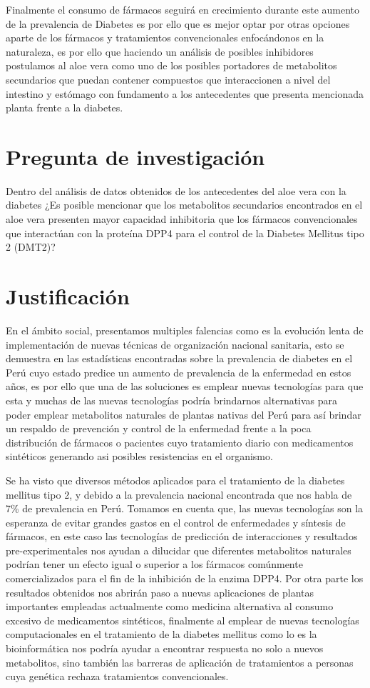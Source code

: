 Finalmente el consumo de fármacos seguirá en crecimiento durante este aumento de la prevalencia de Diabetes es por ello que es mejor optar por otras opciones aparte de los fármacos y tratamientos convencionales enfocándonos en la naturaleza, es por ello que haciendo un análisis de posibles inhibidores postulamos al aloe vera como uno de los posibles portadores de metabolitos secundarios que puedan contener compuestos que interaccionen a nivel del intestino y estómago con fundamento a los antecedentes que presenta mencionada planta frente a la diabetes.

\section{Pregunta de investigación}
Dentro del análisis de datos obtenidos de los antecedentes del aloe vera con la diabetes ¿Es posible mencionar que los metabolitos secundarios encontrados en el aloe vera presenten mayor capacidad inhibitoria que los  fármacos convencionales que interactúan con la proteína DPP4 para el control de la Diabetes Mellitus tipo 2 (DMT2)?

\section{Justificación}
En el ámbito social, presentamos multiples falencias como es la evolución lenta de implementación de nuevas técnicas de organización nacional sanitaria, esto se demuestra en las estadísticas encontradas sobre la prevalencia de diabetes en el Perú cuyo estado predice un aumento de prevalencia de la enfermedad en estos años, es por ello que una de las soluciones es emplear nuevas tecnologías para que esta y muchas de las nuevas tecnologías podría brindarnos alternativas para poder emplear metabolitos naturales de plantas nativas del Perú para así brindar un respaldo de prevención y control de la enfermedad frente a la poca distribución de fármacos o pacientes cuyo tratamiento diario con medicamentos sintéticos generando asi posibles resistencias en el organismo.  


Se ha visto que diversos métodos aplicados para el tratamiento de la diabetes mellitus tipo 2, y debido a la prevalencia nacional encontrada que nos habla de 7\% de prevalencia en Perú. Tomamos en cuenta que, las nuevas tecnologías son la esperanza de evitar grandes gastos en el control de enfermedades y síntesis de fármacos, en este caso las tecnologías de predicción de interacciones y resultados pre-experimentales nos ayudan a dilucidar que diferentes metabolitos naturales podrían tener un efecto igual o superior a los fármacos comúnmente comercializados para el fin de la inhibición de la enzima DPP4. 
Por otra parte los resultados obtenidos nos abrirán paso a nuevas aplicaciones de plantas importantes empleadas actualmente como medicina alternativa al consumo excesivo de medicamentos sintéticos, finalmente al emplear de nuevas tecnologías computacionales en el tratamiento de la diabetes mellitus como lo es la bioinformática nos podría ayudar a encontrar respuesta no solo a nuevos metabolitos, sino también las barreras de aplicación de tratamientos a personas cuya genética rechaza tratamientos convencionales.%

